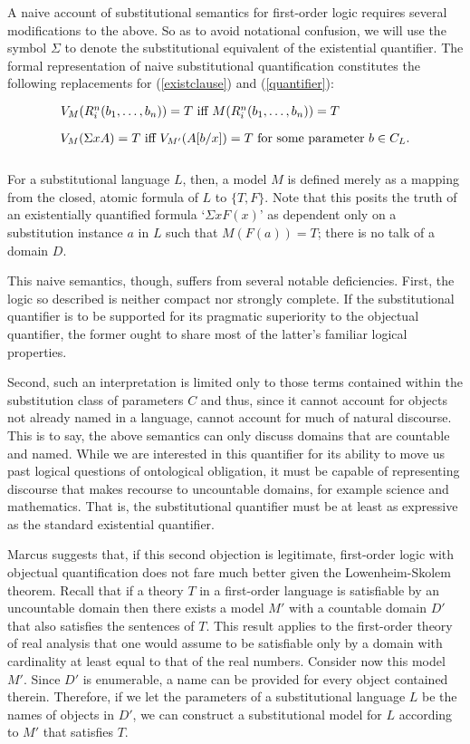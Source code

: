 \documentclass[12pt,letterpaper]{article}
\newenvironment{te}
{\begin{singlespace}
\begin{equation}
\begin{minipage}[t]{0.8\linewidth}}
{\end{minipage}
\end{equation}
\end{singlespace}
\ignorespacesafterend}
\begin{document}
\begin{doublespace}
A naive account of substitutional semantics for first-order logic
requires several modifications to the above. So as to avoid notational
confusion, we will use the symbol $\Sigma$ to denote the
substitutional equivalent of the existential quantifier.  The formal
representation of naive substitutional quantification constitutes the
following replacements for (\ref{existclause}) and (\ref{quantifier}):

\begin{te} 
$V_M(R^n_i(b_1,\ldots ,b_n)) = T$ iff $M(R^n_i(b_1,\ldots ,b_n)) = T$
\end{te}

\begin{te}
$V_M(\Sigma xA) = T$ iff $V_{M'}(A[b/x]) = T$ for some parameter $b
\in C_L$.\\
\end{te} 

For a substitutional language $L$, then, a model $M$ is defined
merely as a mapping from the closed, atomic formula of $L$ to
$\{T,F\}$.  Note that this posits the truth of an existentially
quantified formula `$\Sigma xF(x)$' as dependent only on a substitution
instance $a$ in $L$ such that $M(F(a)) = T$; there is no talk of a
domain $D$.

This naive semantics, though, suffers from several notable
deficiencies.  First, the logic so described is neither compact nor
strongly complete.  If the substitutional quantifier is to be
supported for its pragmatic superiority to the objectual quantifier,
the former ought to share most of the latter's familiar logical
properties.

Second, such an interpretation is limited only to those terms
contained within the substitution class of parameters $C$ and thus,
since it cannot account for objects not already named in a language,
cannot account for much of natural discourse.  This is to say, the
above semantics can only discuss domains that are countable and named.
While we are interested in this quantifier for its ability to move us
past logical questions of ontological obligation, it must be capable
of representing discourse that makes recourse to uncountable domains,
for example science and mathematics. That is, the substitutional
quantifier must be at least as expressive as the standard existential
quantifier.

Marcus \cite{marcus95} suggests that, if this second objection is legitimate,
first-order logic with objectual quantification does not fare much
better given the Lowenheim-Skolem theorem.  Recall that if a theory
$T$ in a first-order language is satisfiable by an uncountable domain
then there exists a model $M'$ with a countable domain $D'$ that also
satisfies the sentences of $T$.  This result applies to the
first-order theory of real analysis that one would assume to be
satisfiable only by a domain with cardinality at least equal to that
of the real numbers. Consider now this model $M'$.  Since $D'$ is
enumerable, a name can be provided for every object contained therein.
Therefore, if we let the parameters of a substitutional language $L$
be the names of objects in $D'$, we can construct a substitutional
model for $L$ according to $M'$ that satisfies $T$.


\end{doublespace}
\end{document}
